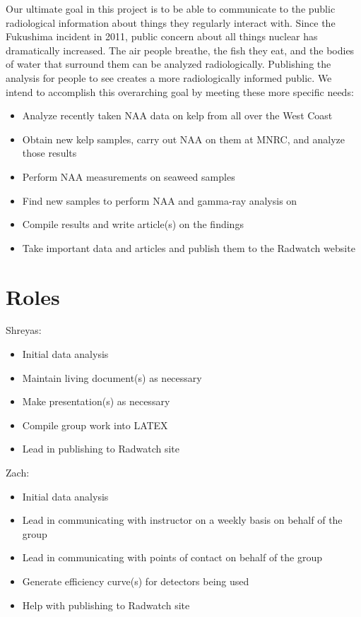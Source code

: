 \documentclass[]{article}
\begin{document}
Our ultimate goal in this project is to be able to communicate to the public radiological information about things they regularly interact with.  Since the Fukushima incident in 2011, public concern about all things nuclear has dramatically increased.  The air people breathe, the fish they eat, and the bodies of water that surround them can be analyzed radiologically.  Publishing the analysis for people to see creates a more radiologically informed public.  We intend to accomplish this overarching goal by meeting these more specific needs:
\begin{itemize}
\item Analyze recently taken NAA data on kelp from all over the West Coast
\item Obtain new kelp samples, carry out NAA on them at MNRC, and analyze those results
\item Perform NAA measurements on seaweed samples
\item Find new samples to perform NAA and gamma-ray analysis on
\item Compile results and write article(s) on the findings
\item Take important data and articles and publish them to the Radwatch website
\end{itemize}

\section{Roles}
Shreyas:
\begin{itemize}
\item Initial data analysis
\item Maintain living document(s) as necessary 
\item Make presentation(s) as necessary
\item Compile group work into LATEX
\item Lead in publishing to Radwatch site
\end{itemize}

Zach: 
\begin{itemize}
\item Initial data analysis
\item Lead in communicating with instructor on a weekly basis on behalf of the group
\item Lead in communicating with points of contact on behalf of the group
\item Generate efficiency curve(s) for detectors being used
\item Help with publishing to Radwatch site
\end{itemize}
\end{document}

